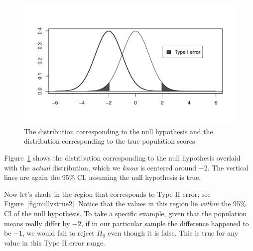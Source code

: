 \documentclass[12pt]{book}\usepackage[]{graphicx}\usepackage[]{color}
\makeatletter
\def\maxwidth{ %
  \ifdim\Gin@nat@width>\linewidth
    \linewidth
  \else
    \Gin@nat@width
  \fi
}
\newenvironment{knitrout}{}{} %
\makeatother
\begin{document}
\begin{figure}[!htbp]
\centering 
\begin{knitrout}
\color{fgcolor}
\includegraphics[width=\maxwidth]{figure/unnamed-chunk-61-1} 

\end{knitrout}
  \caption{The distribution corresponding to the null hypothesis and
    the distribution corresponding to the true population scores.}
  \label{fig:nullvstrue}
\end{figure}

Figure~\ref{fig:nullvstrue} shows the distribution corresponding to
the null hypothesis overlaid with the \emph{actual} distribution,
which we \emph{know} is centered around $-2$.  The vertical lines are again the
95\% CI, assuming the null hypothesis is true.

Now let's shade in the region that corresponds to Type II error; see Figure~\ref{fig:nullvstrue2}.
Notice that the values in this region lie \emph{within} the 95\% CI of the null hypothesis. To take a specific example, given that the population means really differ by $-2$, if in our particular sample the difference happened to be $-1$, we would fail to reject $H_0$ even though it is false. This is true for any value in this Type II error range.
\end{document}

